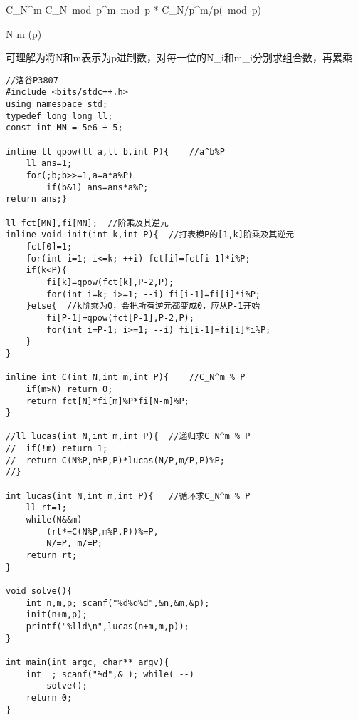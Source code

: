C_N^m \equiv C_{N\ mod\ p}^{m\ mod\ p} * C_{N/p}^{m/p}(\ mod\ p)

\tbinom N m \equiv {} \cdot {}(\mod p)

可理解为将N和m表示为p进制数，对每一位的N_i和m_i分别求组合数，再累乘

\begin{lstlisting}
//洛谷P3807 
#include <bits/stdc++.h>
using namespace std;
typedef long long ll;
const int MN = 5e6 + 5;

inline ll qpow(ll a,ll b,int P){	//a^b%P 
	ll ans=1;
	for(;b;b>>=1,a=a*a%P)
		if(b&1) ans=ans*a%P;
return ans;}

ll fct[MN],fi[MN];	//阶乘及其逆元
inline void init(int k,int P){	//打表模P的[1,k]阶乘及其逆元
	fct[0]=1;
	for(int i=1; i<=k; ++i) fct[i]=fct[i-1]*i%P;
	if(k<P){
		fi[k]=qpow(fct[k],P-2,P);
		for(int i=k; i>=1; --i) fi[i-1]=fi[i]*i%P;
	}else{	//k阶乘为0，会把所有逆元都变成0，应从P-1开始
		fi[P-1]=qpow(fct[P-1],P-2,P);
		for(int i=P-1; i>=1; --i) fi[i-1]=fi[i]*i%P;
	}
}

inline int C(int N,int m,int P){	//C_N^m % P
	if(m>N) return 0;
	return fct[N]*fi[m]%P*fi[N-m]%P;
}

//ll lucas(int N,int m,int P){	//递归求C_N^m % P
//	if(!m) return 1;
//	return C(N%P,m%P,P)*lucas(N/P,m/P,P)%P;
//}

int lucas(int N,int m,int P){	//循环求C_N^m % P
	ll rt=1;
	while(N&&m)
		(rt*=C(N%P,m%P,P))%=P,
		N/=P, m/=P;
	return rt;
}

void solve(){
	int n,m,p; scanf("%d%d%d",&n,&m,&p);
	init(n+m,p);
	printf("%lld\n",lucas(n+m,m,p));
}

int main(int argc, char** argv){ 
	int _; scanf("%d",&_); while(_--)
		solve();
	return 0;
}
\end{lstlisting}